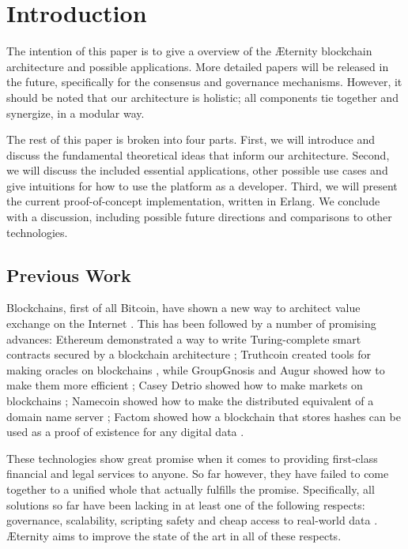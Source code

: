 \documentclass[a4paper, 10pt, conference]{ieeeconf}      %
\begin{document}
\section{Introduction}
\begin{draft}
The intention of this paper is to give a overview of the Æternity blockchain architecture and possible applications. More detailed papers will be released in the future, specifically for the consensus and governance mechanisms. However, it should be noted that our architecture is holistic; all components tie together and synergize, in a modular way.

The rest of this paper is broken into four parts. First, we will introduce and discuss the fundamental theoretical ideas that inform our architecture. Second, we will discuss the included essential applications, other possible use cases and give intuitions for how to use the platform as a developer. Third, we will present the current proof-of-concept implementation, written in Erlang. We conclude with a discussion, including possible future directions and comparisons to other technologies.

\subsection{Previous Work}
Blockchains, first of all Bitcoin, have shown a new way to architect value exchange on the Internet \cite{bitcoin}. This has been followed by a number of promising advances: Ethereum demonstrated a way to write Turing-complete smart contracts secured by a blockchain architecture \cite{ethereum}; Truthcoin created tools for making oracles on blockchains \cite{hivemind}, while GroupGnosis and Augur showed how to make them more efficient \cite{groupgnosis}; Casey Detrio showed how to make markets on blockchains \cite{smart-markets}; Namecoin showed how to make the distributed equivalent of a domain name server \cite{namecoin}; Factom showed how a blockchain that stores hashes can be used as a proof of existence for any digital data \cite{factom}.

These technologies show great promise when it comes to providing first-class financial and legal services to anyone. So far however, they have failed to come together to a unified whole that actually fulfills the promise. Specifically, all solutions so far have been lacking in at least one of the following respects: governance, scalability, scripting safety and cheap access to real-world data \source. Æternity aims to improve the state of the art in all of these respects.


\end{draft}
\end{document}

